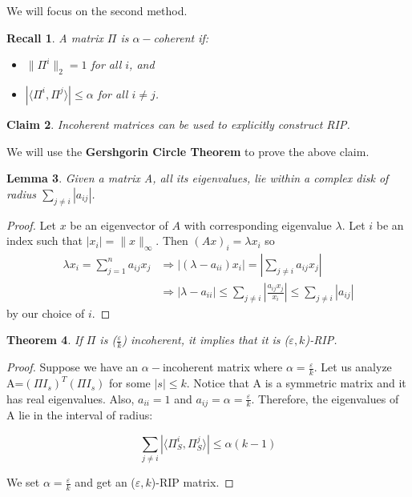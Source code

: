 \documentclass[11pt]{article}
\newcommand{\eps}{\varepsilon}
\newtheorem{theorem}{Theorem}
\newtheorem{lemma}[theorem]{Lemma}
\newtheorem{claim}[theorem]{Claim}
\newtheorem{recall}[theorem]{Recall}
\begin{document}
We will focus on the second method. 

\begin{recall}
	A matrix $\Pi$ is $\alpha-$coherent if:
	\begin{itemize}
		\item $\|\Pi^i\|_2 = 1$ for all $i$, and
		\item $|\langle \Pi^i, \Pi^j \rangle| \le \alpha$ for all $i \ne j$.
	\end{itemize}
\end{recall}

\begin{claim}
	Incoherent matrices can be used to explicitly construct RIP. 
\end{claim}

We will use the \textbf{Gershgorin Circle Theorem} to prove the 
above claim.

\begin{lemma}
	Given a matrix A, all its eigenvalues, lie within a complex disk 
	of radius $\sum_{j \neq i} |a_{ij}|$. 
\end{lemma}

\begin{proof}
	Let $x$ be an eigenvector of $A$ with corresponding eigenvalue $
	\lambda$. Let $i$ be an index such that $|x_i| = \|x\|_\infty$. 
	Then $(Ax)_i = \lambda x_i$ so
	\begin{align*}
		\lambda x_i = \sum_{j=1}^n a_{ij}x_j &\Rightarrow |(\lambda - 
		a_{ii})x_i| = \left| \sum_{j \ne i} a_{ij}x_j\right| \\
		&\Rightarrow |\lambda - a_{ii}| \le  \sum_{j \ne i} \left|
		\frac{a_{ij}x_j}{x_i}\right| \le \sum_{j \ne i} |a_{ij}|
	\end{align*}
	by our choice of $i$.
\end{proof}

\begin{theorem}
	If $\Pi$ is ($\frac{\eps}{k}$) incoherent, it implies that it is 
	($\eps,k$)-RIP.
\end{theorem}

\begin{proof}
	Suppose we have an $\alpha-$incoherent matrix where $\alpha = 
	\frac{\eps}{k}$. Let us analyze A=$(\Pi I_s)^T(\Pi I_s)$ for some 
	$|s| \leq k$. Notice that A is a symmetric matrix and it has 
	real eigenvalues. Also, $a_{ii} = 1$ and $a_{ij} = \alpha = 
	\frac{\eps}{k}$. Therefore, the eigenvalues of A lie in the 
	interval of radius:
	
	$$
	\sum_{j \ne i} |\langle \Pi_S^i, \Pi_S^j \rangle| \le \alpha(k-1)
	$$
	
	We set $\alpha = \frac{\eps}{k}$ and get an ($\eps,k$)-RIP 
	matrix.
\end{proof}
\end{document}
